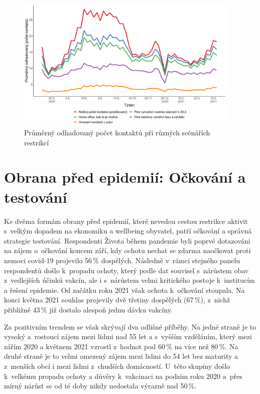 \begin{figure}[ht]
    \centering
    \includegraphics[width=0.95\textwidth]{./pic/zbp-graf5.png}
    \caption{Průměrný odhadovaný počet kontaktů při různých scénářích restrikcí}
    \label{fig:zbp5}
\end{figure}


\section*{Obrana před epidemií: Očkování a testování}

Ke dvěma formám obrany před epidemií, které nevedou cestou restrikce aktivit s velkým dopadem na ekonomiku a wellbeing obyvatel, patří očkování a správná strategie testování. Respondenti Života během pandemie byli poprvé dotazováni na zájem o~očkování koncem září, kdy ochotu nechat se zdarma naočkovat proti nemoci covid-19 projevilo 56\,\% dospělých. Následně v rámci stejného panelu respondentů došlo k propadu ochoty, který podle dat souvisel s nárůstem obav z vedlejších účinků vakcín, ale i s nárůstem velmi kritického postoje k institucím a řešení epidemie. Od začátku roku 2021 však ochota k očkování stoupala. Na konci května 2021 souhlas projevily dvě třetiny dospělých (67\,\%), z nichž přibližně 43\,\% již dostalo alespoň jednu dávku vakcíny. 

Za pozitivním trendem se však skrývají dva odlišné příběhy. Na jedné straně je to vysoký a rostoucí zájem mezi lidmi nad 55 let a s vyšším vzděláním, který mezi zářím 2020 a květnem 2021 vzrostl z hodnot pod 60\,\% na více než 80\,\%. Na druhé straně je to velmi omezený zájem mezi lidmi do 54 let bez maturity a z menších obcí i mezi lidmi z~chudších domácností. U této skupiny došlo k velkému propadu ochoty a důvěry k vakcinaci na podzim roku 2020 a přes mírný nárůst se od té doby nikdy nedostala výrazně nad 50\,\%. 

